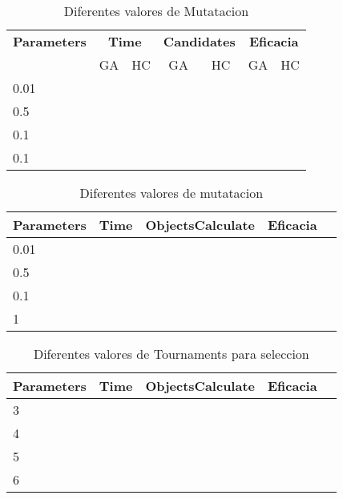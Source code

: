 \begin{table}[t!]
\centering
\begin{tabular}{l|cc|cc|cc}
\hline

\textbf{Parameters}& \multicolumn{2}{c}{\textbf{Time}} & \multicolumn{2}{c}{\textbf{Candidates}} & \multicolumn{2}{c}{\textbf{Eficacia}} \\
 &GA&HC&GA&HC&GA&HC \\

\hline

0.01 & &  &\\

0.5 & &  &\\
0.1 & &  &\\
0.1 & &  &\\
\midrule

\end{tabular}%
\caption{Diferentes valores de Mutatacion}
\label{tab:MutationGA}
\end{table}

\begin{table}[t!]
\centering
\begin{tabular}{l l ccc}
\hline

\textbf{Parameters}& \textbf{Time} & \textbf{ObjectsCalculate} & \textbf{Eficacia} \\
\midrule

0.01 & &  &\\

0.5 & &  &\\
0.1 & &  &\\
1 & &  &\\
\midrule

\end{tabular}%
\caption{Diferentes valores de mutatacion}
\label{tab:CrossOverGA}
\end{table}

\begin{table}[t!]
\centering
\begin{tabular}{l l ccc}
\hline

\textbf{Parameters}& \textbf{Time} & \textbf{ObjectsCalculate} & \textbf{Eficacia} \\
\midrule

3 & &  &\\

4 & &  &\\
5 & &  &\\
6 & &  &\\
\midrule

\end{tabular}%
\caption{Diferentes valores de Tournaments para seleccion}
\label{tab:SelectionGA}
\end{table}